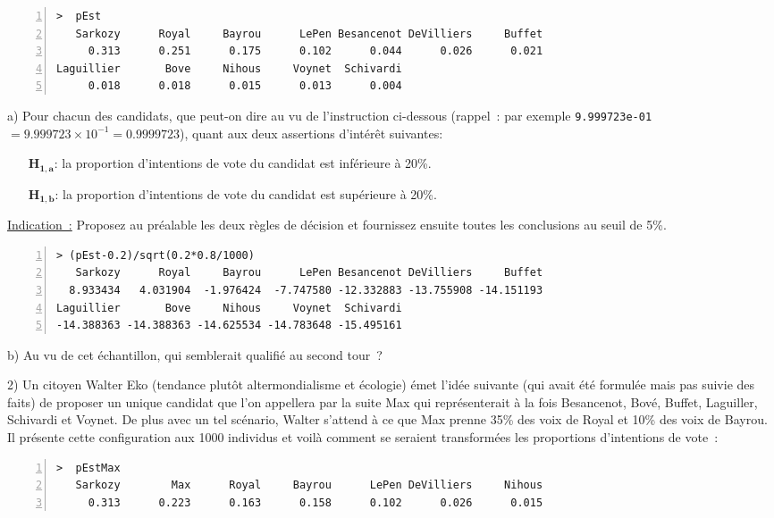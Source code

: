 \documentclass[10pt]{report}
\begin{document}
\begin{exercice}
\begin{Verbatim}[frame=leftline,fontfamily=tt,fontshape=n,numbers=left]
>  pEst 
   Sarkozy      Royal     Bayrou      LePen Besancenot DeVilliers     Buffet 
     0.313      0.251      0.175      0.102      0.044      0.026      0.021 
Laguillier       Bove     Nihous     Voynet  Schivardi 
     0.018      0.018      0.015      0.013      0.004
\end{Verbatim}


a) 
Pour chacun des candidats, que peut-on dire au vu de l'instruction ci-dessous (rappel~: par exemple \texttt{9.999723e-01}$=9.999723\times 10^{-1}=0.9999723$), quant aux deux assertions d'intérêt suivantes: 
\begin{itemize}
\item[$\mathbf{H_{1,a}}$:] la proportion d'intentions de vote du candidat est inférieure à 20\%.
\item[$\mathbf{H_{1,b}}$:] la proportion d'intentions de vote du candidat est supérieure à 20\%.
\end{itemize}
\underline{Indication~:} Proposez au préalable les deux règles de décision et fournissez ensuite toutes les conclusions au seuil de 5\%.

\begin{Verbatim}[frame=leftline,fontfamily=tt,fontshape=n,numbers=left]
> (pEst-0.2)/sqrt(0.2*0.8/1000)
   Sarkozy      Royal     Bayrou      LePen Besancenot DeVilliers     Buffet 
  8.933434   4.031904  -1.976424  -7.747580 -12.332883 -13.755908 -14.151193 
Laguillier       Bove     Nihous     Voynet  Schivardi 
-14.388363 -14.388363 -14.625534 -14.783648 -15.495161
\end{Verbatim}




b) 
Au vu de cet échantillon, qui semblerait qualifié au second tour~?





2) 
Un citoyen Walter Eko (tendance plutôt altermondialisme et écologie) émet l'idée suivante (qui avait été formulée mais pas suivie des faits) de proposer un unique candidat que l'on appellera par la suite Max qui représenterait à la fois Besancenot, Bové, Buffet, Laguiller, Schivardi et Voynet. De plus avec un tel scénario, Walter s'attend à ce que Max prenne 35\% des voix de Royal et 10\% des voix de Bayrou. Il présente cette configuration aux 1000 individus et voilà comment se seraient transformées les proportions d'intentions de vote~:

\begin{Verbatim}[frame=leftline,fontfamily=tt,fontshape=n,numbers=left]
>  pEstMax 
   Sarkozy        Max      Royal     Bayrou      LePen DeVilliers     Nihous 
     0.313      0.223      0.163      0.158      0.102      0.026      0.015
\end{Verbatim}



\end{exercice}
\end{document}

